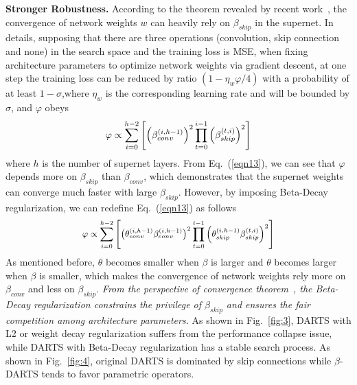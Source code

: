 \documentclass[10pt,twocolumn,letterpaper]{article}
\newcommand{\bp}[1]{\textcolor{black}{#1}}
\begin{document}
\noindent\textbf{Stronger Robustness.} According to the theorem revealed by recent work~\cite{prdarts}, the convergence of network weights $w$ can heavily rely on $\beta_{skip}$ in the supernet. In details, supposing that there are three operations (convolution, skip connection and none) in the search space and the training loss is MSE, when fixing architecture parameters to optimize network weights via gradient descent, at one step the training loss can be reduced by ratio  $(1-\eta_w\varphi/4)$ with \bp{a} probability of at least $1-\sigma$,where $\eta_w$ is the corresponding learning rate and will be bounded by $\sigma$, and $\varphi$ obeys
\begin{equation} \label{eqn13}
  \begin{split}
    \varphi \propto \sum_{i=0}^{h-2}\left[\left(\beta_{conv}^{(i, h-1)}\right)^{2} \prod_{t=0}^{i-1}\left(\beta_{skip}^{(t, i)}\right)^{2}\right]
  \end{split}
  \vspace{-6pt}
\end{equation}
where $h$ is the number of supernet layers. From Eq.~(\ref{eqn13}), we can see that $\varphi$ depends more on $\beta_{skip}$ than $\beta_{conv}$, which demonstrates that the supernet weights can converge much faster with large $\beta_{skip}$. However, by imposing Beta-Decay regularization, we can redefine Eq.~(\ref{eqn13}) as follows
\begin{equation} \label{eqn14}
\small
  \begin{split}
    \varphi \propto \sum_{i=0}^{h-2}\left[\left(\theta_{conv}^{(i, h-1)}\beta_{conv}^{(i, h-1)}\right)^{2} \prod_{t=0}^{i-1}\left(\theta_{skip}^{(i, h-1)}\beta_{skip}^{(t, i)}\right)^{2}\right]
  \end{split}
  \vspace{-6pt}
\end{equation}
As mentioned before, $\theta$ becomes smaller when $\beta$ is larger and $\theta$ becomes larger when $\beta$ is smaller, which makes the convergence of network weights rely more on $\beta_{conv}$ and less on $\beta_{skip}$. \textit{From the perspective of convergence theorem}~\cite{prdarts}\textit{, the Beta-Decay regularization constrains the privilege of $\beta_{skip}$ and ensures the fair competition among architecture parameters.} As shown in Fig.~\ref{fig:3}, DARTS with L2 or weight decay regularization suffers from the performance collapse issue, while DARTS with Beta-Decay regularization has a stable search process. As shown in Fig.~\ref{fig:4}, original DARTS is dominated by skip connections while $\beta$-DARTS tends to favor parametric operators.
\end{document}
